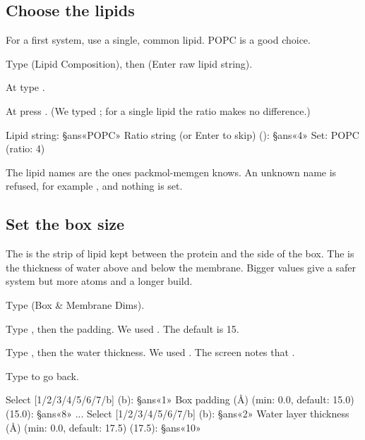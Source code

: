 \subsection{Choose the lipids}

For a first system, use a single, common lipid. POPC is a good choice.

\begin{steps}
  \item Type  (\textsf{Lipid Composition}), then 
        (\textsf{Enter raw lipid string}).
  \item At  type .
  \item At  press . (We
        typed ; for a single lipid the ratio makes no difference.)
\begin{screen}
Lipid string: §ans«POPC»
Ratio string (or Enter to skip) (): §ans«4»
Set: POPC (ratio: 4)
\end{screen}
\end{steps}

The lipid names are the ones packmol-memgen knows. An unknown name is refused,
for example , and nothing is set.

\subsection{Set the box size}

The  is the strip of lipid kept between the protein and the
side of the box. The  is the thickness of water above and
below the membrane. Bigger values give a safer system but more atoms and a
longer build.

\begin{steps}
  \item Type  (\textsf{Box \& Membrane Dims}).
  \item Type , then the padding. We used . The default is 15.
  \item Type , then the water thickness. We used . The
        screen notes that .
  \item Type  to go back.
\end{steps}

\begin{screen}
Select [1/2/3/4/5/6/7/b] (b): §ans«1»
Box padding (Å) (min: 0.0, default: 15.0) (15.0): §ans«8»
...
Select [1/2/3/4/5/6/7/b] (b): §ans«2»
Water layer thickness (Å) (min: 0.0, default: 17.5) (17.5): §ans«10»
\end{screen}

